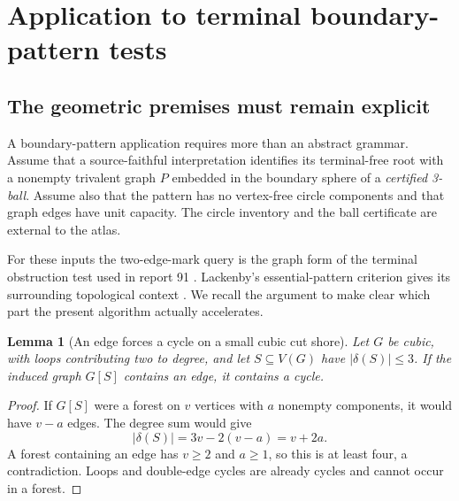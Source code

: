 \documentclass[11pt,letterpaper]{article}
\newtheorem{lemma}[theorem]{Lemma}
\theoremstyle{definition}
\theoremstyle{remark}\newtheorem{remark}[theorem]{Remark}
\begin{document}
\section{Application to terminal boundary-pattern tests}
\label{sec:topology}
\subsection{The geometric premises must remain explicit}
A boundary-pattern application requires more than an abstract grammar. Assume that a source-faithful interpretation identifies its terminal-free root with a nonempty trivalent graph $P$ embedded in the boundary sphere of a \emph{certified 3-ball}. Assume also that the pattern has no vertex-free circle components and that graph edges have unit capacity. The circle inventory and the ball certificate are external to the atlas.

For these inputs the two-edge-mark query is the graph form of the terminal obstruction test used in report 91 \cite{sparse}. Lackenby's essential-pattern criterion gives its surrounding topological context \cite[Proposition 2.6]{lackenby}. We recall the argument to make clear which part the present algorithm actually accelerates.

\begin{lemma}[An edge forces a cycle on a small cubic cut shore]\label{lem:cubic}
Let $G$ be cubic, with loops contributing two to degree, and let $S\subseteq V(G)$ have $|\delta(S)|\le3$. If the induced graph $G[S]$ contains an edge, it contains a cycle.
\end{lemma}
\begin{proof}
If $G[S]$ were a forest on $v$ vertices with $a$ nonempty components, it would have $v-a$ edges. The degree sum would give
\[
 |\delta(S)|=3v-2(v-a)=v+2a.
\]
A forest containing an edge has $v\ge2$ and $a\ge1$, so this is at least four, a contradiction. Loops and double-edge cycles are already cycles and cannot occur in a forest.
\end{proof}
\end{document}
